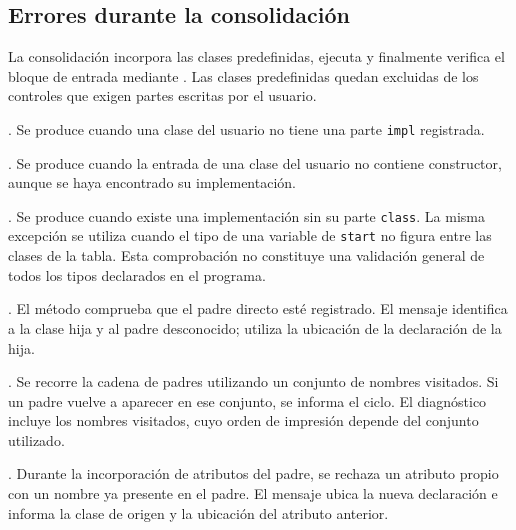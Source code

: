 \subsection{Errores durante la consolidación}
La consolidación incorpora las clases predefinidas, ejecuta
 y finalmente verifica el bloque de entrada
mediante . Las clases predefinidas quedan
excluidas de los controles que exigen partes escritas por el usuario.

\begin{description}[style=nextline]
  \item[Implementación inexistente]
  . Se produce cuando una clase del
  usuario no tiene una parte \texttt{impl} registrada.

  \item[Constructor inexistente]
  . Se produce cuando la entrada
  de una clase del usuario no contiene constructor, aunque se haya
  encontrado su implementación.

  \item[Clase no declarada]
  . Se produce cuando existe una
  implementación sin su parte \texttt{class}. La misma excepción se
  utiliza cuando el tipo de una variable de \texttt{start} no figura
  entre las clases de la tabla. Esta comprobación no constituye una
  validación general de todos los tipos declarados en el programa.

  \item[Superclase inexistente]
  . El método
   comprueba que el padre directo esté
  registrado. El mensaje identifica a la clase hija y al padre
  desconocido; utiliza la ubicación de la declaración de la hija.

  \item[Herencia circular]
  . Se recorre la cadena de
  padres utilizando un conjunto de nombres visitados. Si un padre
  vuelve a aparecer en ese conjunto, se informa el ciclo. El diagnóstico
  incluye los nombres visitados, cuyo orden de impresión depende del
  conjunto utilizado.

  \item[Redeclaración de un atributo heredado]
  . Durante la incorporación
  de atributos del padre, se rechaza un atributo propio con un nombre
  ya presente en el padre. El mensaje ubica la nueva declaración e
  informa la clase de origen y la ubicación del atributo anterior.


\end{description}
